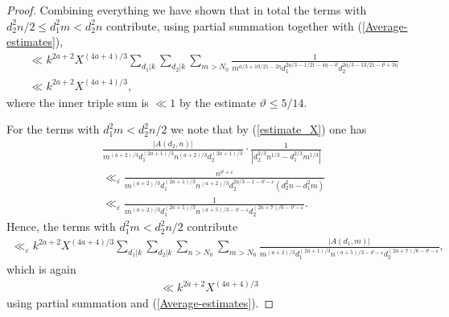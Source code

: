 \documentclass[a4paper,10pt,twoside]{amsart}
\theoremstyle{definition}
\numberwithin{equation}{section}
\newcommand\eps{\varepsilon}
\renewcommand{\Re}{\textnormal{Re}}
\renewcommand\:{\colon}
\begin{document}
\begin{proof}
Combining everything we have shown that in total the terms with $d_2^2n/2\leq d_1^2m<d_2^2n$ contribute, using partial summation together with (\ref{Average-estimates}),
\begin{align}\label{Estimate-6}
&\ll k^{2a+2}X^{(4a+4)/3}\sum_{d_1|k}\sum_{d_2|k}\sum_{m>N_0}\frac{1}{m^{a/3+10/21-2\eta}d_1^{2a/3-1/21-4\eta-\vartheta}d_2^{2a/3-13/21-\vartheta+3\eta}} \nonumber\\
&\ll k^{2a+2}X^{(4a+4)/3},
\end{align}
where the inner triple sum is $\ll 1$ by the estimate $\vartheta\leq 5/14$. 

For the terms with $d_1^2m<d_2^2n/2$ we note that by (\ref{estimate_X}) one has
\begin{align*}
&\frac{|A(d_2,n)|}{m^{(a+2)/3}d_1^{(2a+1)/3}n^{(a+2)/3}d_2^{(2a+1)/3}}\cdot\frac1{|d_2^{2/3}n^{1/3}-d_1^{2/3}m^{1/3}|} \nonumber\\
&\ll_\eps\frac{n^{\vartheta+\varepsilon}}{m^{(a+2)/3}d_1^{(2a+1)/3}n^{(a+2)/3}d_2^{2a/3-1-\vartheta-\varepsilon}(d_2^2n-d_1^2m)}\\
&\ll_\eps \frac1{m^{(a+2)/3}d_1^{(2a+1)/3}n^{(a+5)/3-\vartheta-\varepsilon}d_2^{(2a+7)/6-\vartheta-\varepsilon}}.
\end{align*}
Hence, the terms with $d_1^2m<d_2^2n/2$ contribute
\begin{align*}
\ll_\eps k^{2a+2}X^{(4a+4)/3}\sum_{d_1|k}\sum_{d_2|k}\sum_{n>N_0}\sum_{m>N_0}\frac{|A(d_1,m)|}{m^{(a+2)/3}d_1^{(2a+1)/3}n^{(a+5)/3-\vartheta-\varepsilon}d_2^{(2a+7)/6-\vartheta-\varepsilon}},
\end{align*}
which is again 
\begin{align}\label{Estimate-7}
\ll k^{2a+2}X^{(4a+4)/3}
\end{align}
using partial summation and (\ref{Average-estimates}). 
  
    


\end{proof}
\end{document}
